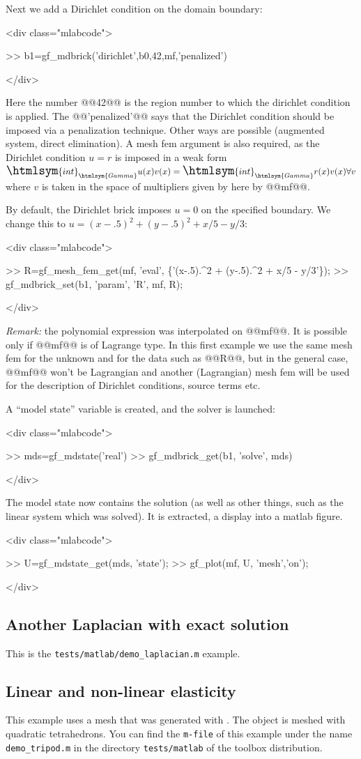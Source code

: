 \documentclass[11pt,a4paper]{article}
\newcommand{\sf}[1]{#1}
\newcommand{\WEB}[2]{\xmlattributes*{a}{target="_top"}\xlink{#2}{#1}}
\newcommand{\Gamma}{\htmlsym{Gamma}}
\newcommand{\int}{{\Large\htmlsym{int}}}
\newenvironment{matlab}{\begin{rawxml}<div class="mlabcode">\end{rawxml}\begin{example}}{\end{example}\begin{rawxml}</div>\end{rawxml}}
\newcommand{\WEB}[2]{\href{#1}{#2}}
\newenvironment{matlab}{\begin{alltt}}{\end{alltt}}
\newcommand{\mf}{mesh fem\xspace}
\newcommand{\mlab}{{\sf matlab}\xspace}
\begin{document}
Next we add a Dirichlet condition on the domain boundary:
\begin{matlab}
>> b1=gf_mdbrick('dirichlet',b0,42,mf,'penalized')
\end{matlab}
Here the number @@42@@ is the region number to which the dirichlet condition is applied. The @@'penalized'@@ says that the Dirichlet condition should be imposed via a penalization technique. Other ways are possible (augmented system, direct elimination). A \mf argument is also required, as the Dirichlet condition $u=r$ is imposed in a weak form
$\int_\Gamma u(x)v(x) = \int_\Gamma r(x)v(x) \forall v$ where $v$ is taken in the space of multipliers given by here by @@mf@@.

By default, the Dirichlet brick imposes $u=0$ on the specified boundary. We change this to $u=(x-.5)^2+(y-.5)^2+x/5-y/3$:
\begin{matlab}
>> R=gf_mesh_fem_get(mf, 'eval', \{'(x-.5).^2 + (y-.5).^2 + x/5 - y/3'\});
>> gf_mdbrick_set(b1, 'param', 'R', mf, R); 
\end{matlab}
\textit{Remark:} the polynomial expression was interpolated on @@mf@@.
It is possible only if @@mf@@ is of Lagrange type. In this first
example we use the same \mf for the unknown and for the data such as
@@R@@, but in the general case, @@mf@@ won't be Lagrangian and another
(Lagrangian) \mf will be used for the description of Dirichlet
conditions, source terms etc.


A ``model state'' variable is created, and the solver is launched:
\begin{matlab}
>> mds=gf_mdstate('real')
>> gf_mdbrick_get(b1, 'solve', mds)
\end{matlab}

The model state now contains the solution (as well as other things, such as the linear system which was solved). It is extracted, a display into a \mlab figure.
\begin{matlab}
>> U=gf_mdstate_get(mds, 'state');
>> gf_plot(mf, U, 'mesh','on');
\end{matlab}

\subsection{Another Laplacian with exact solution}
This is the \texttt{tests/matlab/demo_laplacian.m} example.



\subsection{Linear and non-linear elasticity}
This example  uses a mesh that was generated with
\WEB{http://gid.cimne.upc.es}{GiD}. The object is meshed with
quadratic tetrahedrons. You can find the \texttt{m-file} of this example under
the name \texttt{demo_tripod.m} in the directory \texttt{tests/matlab} of the
toolbox distribution.
\end{document}

